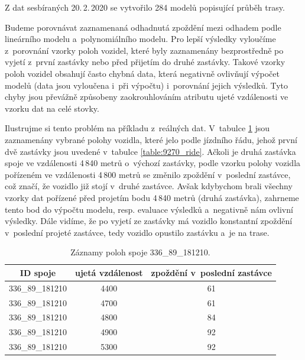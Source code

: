 \bigbreak

Z dat sesbíraných 20.\,2.\,2020 se vytvořilo 284 modelů popisující průběh trasy.


\bigbreak

Budeme porovnávat zaznamenaná odhadnutá zpoždění mezi odhadem podle lineárního modelu a~polynomiálního modelu. Pro lepší výsledky vyloučíme z~porovnání vzorky poloh vozidel, které byly zaznamenány bezprostředně po vyjetí z~první zastávky nebo před přijetím do druhé zastávky. Takové vzorky poloh vozidel obsahují často chybná data, která negativně ovlivňují výpočet modelů (data jsou vyloučena i~při výpočtu) i~porovnání jejich výsledků. Tyto chyby jsou převážně způsobeny zaokrouhlováním atributu ujeté vzdálenosti ve vzorku dat na celé stovky.

\bigbreak

Ilustrujme si tento problém na příkladu z~reálných dat. V~tabulce \ref{table:9270_samples} jsou zaznamenány vybrané polohy vozidla, které jelo podle jízdního řádu, jehož první dvě zastávky jsou uvedené v~tabulce \ref{table:9270_ride}. Ačkoli je druhá zastávka spoje ve vzdálenosti 4\,840 metrů o~výchozí zastávky, podle vzorku polohy vozidla pořízeném ve vzdálenosti 4\,800 metrů se změnilo zpoždění v~poslední zastávce, což značí, že vozidlo již stojí v~druhé zastávce. Avšak kdybychom brali všechny vzorky dat pořízené před projetím bodu 4\,840 metrů (druhá zastávka), zahrneme tento bod do výpočtu modelu, resp. evaluace výsledků a~negativně nám ovlivní výsledky. Dále vidíme, že po vyjetí ze zastávky má vozidlo konstantní zpoždění v~poslední projeté zastávce, tedy vozidlo opustilo zastávku a~je na trase.

\begin{center}
   \begin{table}[ht]
\centering
\begin{tabular}{|c|c|c|}
\hline
ID spoje & ujetá vzdálenost & zpoždění v~poslední zastávce \\ \hline \hline
336\_89\_181210 & 4400 & 61 \\ \hline
336\_89\_181210 & 4700 & 61 \\ \hline
336\_89\_181210 & 4800 & 84 \\ \hline
336\_89\_181210 & 4900 & 92 \\ \hline
336\_89\_181210 & 5300 & 92 \\ \hline
\end{tabular}
\label{table:9270_samples}
\caption{Záznamy poloh spoje 336\_89\_181210.}
\end{table}
\end{center}


